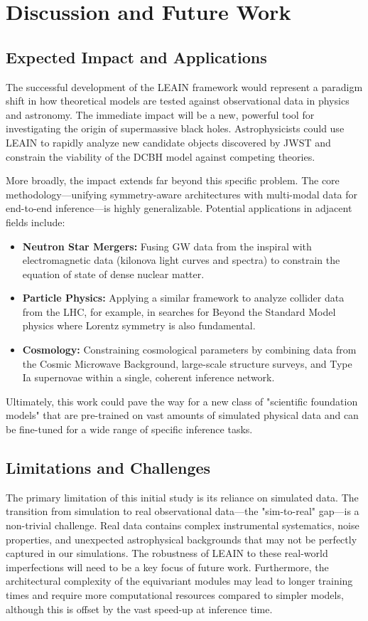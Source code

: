 \documentclass[11pt, a4paper]{article}
\begin{document}
\section{Discussion and Future Work}

\subsection{Expected Impact and Applications}
The successful development of the LEAIN framework would represent a paradigm shift in how theoretical models are tested against observational data in physics and astronomy. The immediate impact will be a new, powerful tool for investigating the origin of supermassive black holes. Astrophysicists could use LEAIN to rapidly analyze new candidate objects discovered by JWST and constrain the viability of the DCBH model against competing theories.

More broadly, the impact extends far beyond this specific problem. The core methodology—unifying symmetry-aware architectures with multi-modal data for end-to-end inference—is highly generalizable. Potential applications in adjacent fields include:
\begin{itemize}
    \item \textbf{Neutron Star Mergers:} Fusing GW data from the inspiral with electromagnetic data (kilonova light curves and spectra) to constrain the equation of state of dense nuclear matter.
    \item \textbf{Particle Physics:} Applying a similar framework to analyze collider data from the LHC, for example, in searches for Beyond the Standard Model physics where Lorentz symmetry is also fundamental.
    \item \textbf{Cosmology:} Constraining cosmological parameters by combining data from the Cosmic Microwave Background, large-scale structure surveys, and Type Ia supernovae within a single, coherent inference network.
\end{itemize}
Ultimately, this work could pave the way for a new class of "scientific foundation models" that are pre-trained on vast amounts of simulated physical data and can be fine-tuned for a wide range of specific inference tasks.

\subsection{Limitations and Challenges}
The primary limitation of this initial study is its reliance on simulated data. The transition from simulation to real observational data—the "sim-to-real" gap—is a non-trivial challenge. Real data contains complex instrumental systematics, noise properties, and unexpected astrophysical backgrounds that may not be perfectly captured in our simulations. The robustness of LEAIN to these real-world imperfections will need to be a key focus of future work. Furthermore, the architectural complexity of the equivariant modules may lead to longer training times and require more computational resources compared to simpler models, although this is offset by the vast speed-up at inference time.
\end{document}
